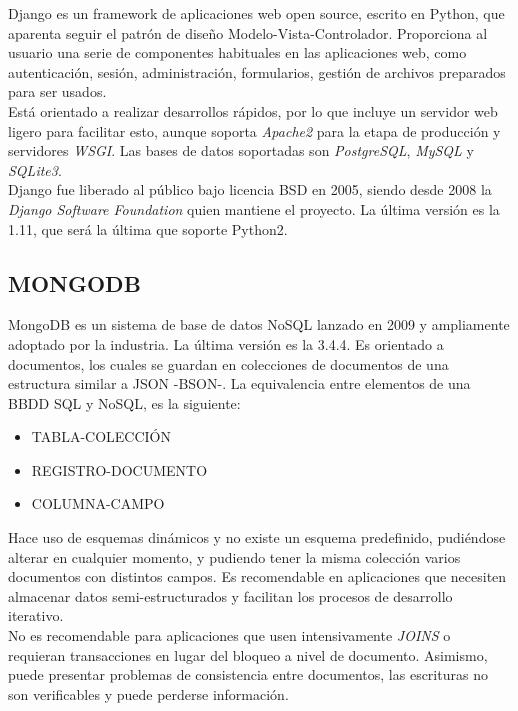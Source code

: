 Django es un framework de aplicaciones web open source, escrito en Python, que aparenta seguir el patrón de diseño Modelo-Vista-Controlador. Proporciona al usuario una serie de componentes habituales en las aplicaciones web, como autenticación, sesión, administración, formularios, gestión de archivos preparados para ser usados.\\


Está orientado a realizar desarrollos rápidos, por lo que incluye un servidor web ligero para facilitar esto, aunque soporta \textit{Apache2} para la etapa de producción y servidores \textit{WSGI}. Las bases de datos soportadas son \textit{PostgreSQL}, \textit{MySQL} y \textit{SQLite3}.\\


Django fue liberado al público bajo licencia BSD en 2005, siendo desde 2008 la \textit{Django Software Foundation} quien mantiene el proyecto. La última versión es la 1.11, que será la última que soporte Python2.


\subsection{MONGODB} 
\label{sec:mongodb}


MongoDB es un sistema de base de datos NoSQL lanzado en 2009 y ampliamente adoptado por la industria. La última versión es la 3.4.4. Es orientado a documentos, los cuales se guardan en colecciones de documentos de una estructura similar a JSON -BSON-.  La equivalencia entre elementos de una BBDD SQL y NoSQL, es la siguiente:\\

\begin{itemize}
\item TABLA-COLECCIÓN\\

\item REGISTRO-DOCUMENTO

\item COLUMNA-CAMPO
\end{itemize}


Hace uso de esquemas dinámicos y no existe un esquema predefinido, pudiéndose alterar en cualquier momento, y pudiendo tener la misma colección varios documentos con distintos campos. Es recomendable en aplicaciones que necesiten almacenar datos semi-estructurados y facilitan los procesos de desarrollo iterativo.\\


No es recomendable para aplicaciones que usen intensivamente \textit{JOINS} o requieran transacciones en lugar del bloqueo a nivel de documento. Asimismo, puede presentar problemas de consistencia entre documentos, las escrituras no son verificables y puede perderse información.\\


